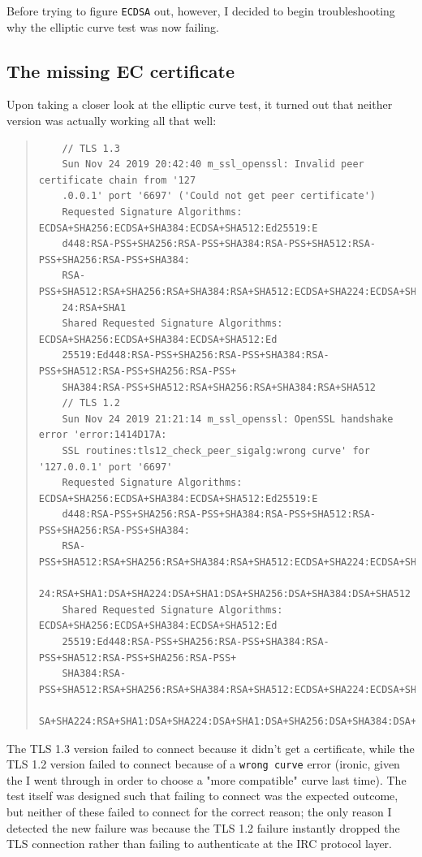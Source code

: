 \documentclass{article}
\begin{document}
Before trying to figure \texttt{ECDSA} out, however, I decided to begin troubleshooting why the elliptic curve test was now failing.

\subsection{The missing EC certificate}
Upon taking a closer look at the elliptic curve test, it turned out that neither version was actually working all that well:

\begin{quote}
\begin{verbatim}
	// TLS 1.3
	Sun Nov 24 2019 20:42:40 m_ssl_openssl: Invalid peer certificate chain from '127
	.0.0.1' port '6697' ('Could not get peer certificate')
	Requested Signature Algorithms: ECDSA+SHA256:ECDSA+SHA384:ECDSA+SHA512:Ed25519:E
	d448:RSA-PSS+SHA256:RSA-PSS+SHA384:RSA-PSS+SHA512:RSA-PSS+SHA256:RSA-PSS+SHA384:
	RSA-PSS+SHA512:RSA+SHA256:RSA+SHA384:RSA+SHA512:ECDSA+SHA224:ECDSA+SHA1:RSA+SHA2
	24:RSA+SHA1
	Shared Requested Signature Algorithms: ECDSA+SHA256:ECDSA+SHA384:ECDSA+SHA512:Ed
	25519:Ed448:RSA-PSS+SHA256:RSA-PSS+SHA384:RSA-PSS+SHA512:RSA-PSS+SHA256:RSA-PSS+
	SHA384:RSA-PSS+SHA512:RSA+SHA256:RSA+SHA384:RSA+SHA512
	// TLS 1.2
	Sun Nov 24 2019 21:21:14 m_ssl_openssl: OpenSSL handshake error 'error:1414D17A:
	SSL routines:tls12_check_peer_sigalg:wrong curve' for '127.0.0.1' port '6697'
	Requested Signature Algorithms: ECDSA+SHA256:ECDSA+SHA384:ECDSA+SHA512:Ed25519:E
	d448:RSA-PSS+SHA256:RSA-PSS+SHA384:RSA-PSS+SHA512:RSA-PSS+SHA256:RSA-PSS+SHA384:
	RSA-PSS+SHA512:RSA+SHA256:RSA+SHA384:RSA+SHA512:ECDSA+SHA224:ECDSA+SHA1:RSA+SHA2
	24:RSA+SHA1:DSA+SHA224:DSA+SHA1:DSA+SHA256:DSA+SHA384:DSA+SHA512
	Shared Requested Signature Algorithms: ECDSA+SHA256:ECDSA+SHA384:ECDSA+SHA512:Ed
	25519:Ed448:RSA-PSS+SHA256:RSA-PSS+SHA384:RSA-PSS+SHA512:RSA-PSS+SHA256:RSA-PSS+
	SHA384:RSA-PSS+SHA512:RSA+SHA256:RSA+SHA384:RSA+SHA512:ECDSA+SHA224:ECDSA+SHA1:R
	SA+SHA224:RSA+SHA1:DSA+SHA224:DSA+SHA1:DSA+SHA256:DSA+SHA384:DSA+SHA512
\end{verbatim}
\end{quote}

The TLS 1.3 version failed to connect because it didn't get a certificate, while the TLS 1.2 version failed to connect because of a \texttt{wrong curve} error (ironic, given the  I went through in order to choose a "more compatible" curve last time).  The test itself was designed such that failing to connect was the expected outcome, but neither of these failed to connect for the correct reason; the only reason I detected the new failure was because the TLS 1.2 failure instantly dropped the TLS connection rather than failing to authenticate at the IRC protocol layer.
\end{document}
